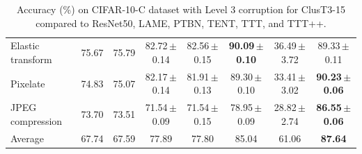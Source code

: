 \documentclass{article}
\newcommand{\ppm}{\,\scriptsize$\pm$}
\begin{document}
\begin{table}[!t]
\begin{small}
{\begin{tabular}{l|ccccccc}
        Elastic transform & 75.67 & 75.79 & 82.72\ppm0.14 & 82.56\ppm0.15 & \textbf{90.09\ppm0.10} & 36.49\ppm3.72 & 89.33\ppm0.11 \\ 
        Pixelate & 74.83 & 75.07 & 82.17\ppm0.14 & 81.91\ppm0.13 & 89.30\ppm0.10 & 33.41\ppm3.02 & \textbf{90.23\ppm0.06} \\ 
        JPEG compression & 73.70 & 73.51 & 71.54\ppm0.09 & 71.54\ppm0.15 & 78.95\ppm0.09 & 28.82\ppm2.74 & \textbf{86.55\ppm0.06} \\ \midrule
        Average & 67.74 & 67.59 & 77.89 & 77.80 & 85.04 & 61.06 & \textbf{87.64} \\ \bottomrule
    \end{tabular}}
    \end{small}
    \caption{Accuracy (\%) on CIFAR-10-C dataset with Level 3 corruption for ClusT3-15 compared to ResNet50, LAME, PTBN, TENT, TTT, and TTT++.}
	\label{tab:Cifar10cComparisonL3}
\end{table}
\end{document}
